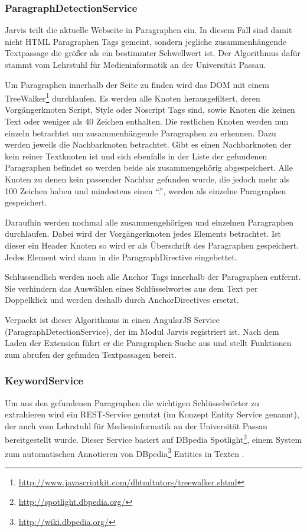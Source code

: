   \subsubsection{ParagraphDetectionService}
  Jarvis teilt die aktuelle Webseite in Paragraphen ein. In diesem Fall sind damit nicht HTML Paragraphen Tags gemeint, sondern jegliche zusammenhängende Textpassage die größer als ein bestimmter Schwellwert ist. Der Algorithmus dafür stammt vom Lehrstuhl für Medieninformatik an der Universität Passau.
 
  Um Paragraphen innerhalb der Seite zu finden wird das DOM mit einem TreeWalker\footnote{\url{http://www.javascriptkit.com/dhtmltutors/treewalker.shtml}} durchlaufen. Es werden alle Knoten herausgefiltert, deren Vorgängerknoten Script, Style oder Noscript Tags sind, sowie Knoten die keinen Text oder weniger als 40 Zeichen enthalten. Die restlichen Knoten werden nun einzeln betrachtet um zusammenhängende Paragraphen zu erkennen. Dazu werden jeweils die Nachbarknoten betrachtet. Gibt es einen Nachbarknoten der kein reiner Textknoten ist und sich ebenfalls in der Liste der gefundenen Paragraphen befindet so werden beide als zusammengehörig abgespeichert. Alle Knoten zu denen kein passender Nachbar gefunden wurde, die jedoch mehr als 100 Zeichen haben und mindestens einen ``.'', werden als einzelne Paragraphen gespeichert.

  Daraufhin werden nochmal alle zusammengehörigen und einzelnen Paragraphen durchlaufen. Dabei wird der Vorgängerknoten jedes Elements betrachtet. Ist dieser ein Header Knoten so wird er als Überschrift des Paragraphen gespeichert. Jedes Element wird dann in die ParagraphDirective eingebettet.

  Schlussendlich werden noch alle Anchor Tags innerhalb der Paragraphen entfernt. Sie verhindern das Auswählen eines Schlüsselwortes aus dem Text per Doppelklick und werden deshalb durch AnchorDirectives ersetzt. 

  Verpackt ist dieser Algorithmus in einen AngularJS Service (ParagraphDetectionService), der im Modul Jarvis registriert ist. Nach dem Laden der Extension führt er die Paragraphen-Suche aus und stellt Funktionen zum abrufen der gefunden Textpassagen bereit.
 
  \subsubsection{KeywordService}
  Um aus den gefundenen Paragraphen die wichtigen Schlüsselwörter zu extrahieren wird ein REST-Service genutzt (im Konzept Entity Service genannt), der auch vom Lehrstuhl für Medieninformatik an der Universität Passau bereitgestellt wurde. Dieser Service basiert auf DBpedia Spotlight\footnote{\url{http://spotlight.dbpedia.org/}}, einem System zum automatischen Annotieren von DBpedia\footnote{\url{http://wiki.dbpedia.org/}} Entities in Texten \cite{daiber2013improving}. 

